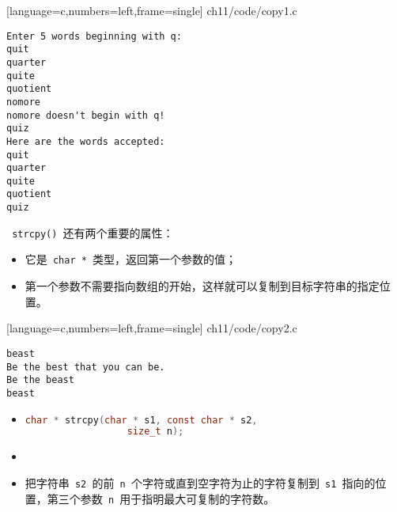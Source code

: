 \begin{frame}

[language=c,numbers=left,frame=single]
{ch11/code/copy1.c}

\end{frame}


\begin{frame}[fragile]
\begin{lstlisting}[backgroundcolor=\color{blue!20}]
Enter 5 words beginning with q:
quit
quarter
quite
quotient
nomore
nomore doesn't begin with q!
quiz
Here are the words accepted:
quit
quarter
quite
quotient
quiz
\end{lstlisting}

\end{frame}

\begin{frame}[fragile] 
\lstinline| strcpy() |还有两个重要的属性：\vspace{0.1in}
\begin{itemize}
\item 它是\lstinline| char * |类型，返回第一个参数的值； \\[0.1in]
\item 第一个参数不需要指向数组的开始，这样就可以复制到目标字符串的指定位置。
\end{itemize}
\end{frame}

\begin{frame}

[language=c,numbers=left,frame=single]
{ch11/code/copy2.c}
\end{frame}

\begin{frame}[fragile]
\begin{lstlisting}[backgroundcolor=\color{blue!20}]
beast
Be the best that you can be.
Be the beast
beast
\end{lstlisting}

\end{frame}

\begin{frame}[fragile] 
\begin{itemize}
\item {}
  \begin{lstlisting}[language=c,backgroundcolor=\color{red!20}]
    char * strcpy(char * s1, const char * s2,
                  size_t n);
\end{lstlisting}
\item 
\item[]
  把字符串\lstinline| s2 |的前\lstinline| n |个字符或直到空字符为止的字符复制到\lstinline| s1 |指向的位置，第三个参数\lstinline| n |用于指明最大可复制的字符数。
\end{itemize}
\end{frame}

